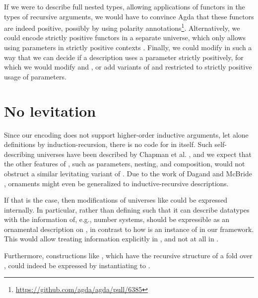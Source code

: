 
If we were to describe full nested types, allowing applications of functors in the types of recursive arguments, we would have to convince Agda that these functors are indeed positive, possibly by using polarity annotations\footnote{\url{https://github.com/agda/agda/pull/6385}}. Alternatively, we could encode strictly positive functors in a separate universe, which only allows using parameters in strictly positive contexts \cite{sijsling}. Finally, we could modify  in such a way that we can decide if a description uses a parameter strictly positively, for which we would modify  and , or add variants of  and  restricted to strictly positive usage of parameters.


\section{No levitation}
Since our encoding does not support higher-order inductive arguments, let alone definitions by induction-recursion, there is no code for  in itself. Such self-describing universes have been described by Chapman et al. \cite{levitation}, and we expect that the other features of , such as parameters, nesting, and composition, would not obstruct a similar levitating variant of . Due to the work of Dagand and McBride \cite{orntrans}, ornaments might even be generalized to inductive-recursive descriptions.

If that is the case, then modifications of universes like  could be expressed internally. In particular, rather than defining  such that it can describe datatypes with the information of, e.g., number systems,  should be expressible as an ornamental description on , in contrast to how  is an instance of  in our framework. This would allow treating information explicitly in , and not at all in .

Furthermore, constructions like , which have the recursive structure of a fold over , could indeed be expressed by instantiating  to .


